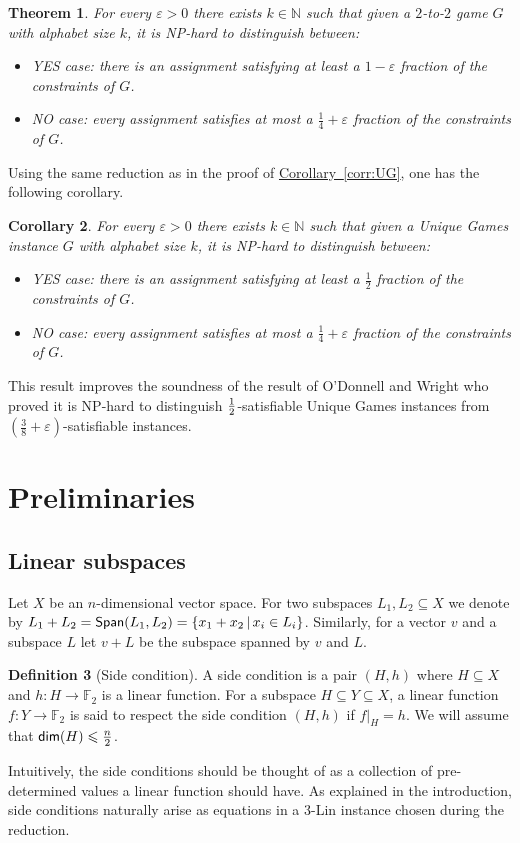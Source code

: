 \documentclass[11pt]{article}
\numberwithin{equation}{section}
\newtheorem{theorem}{Theorem}[section]
\newtheorem{corollary}[theorem]{Corollary}
\theoremstyle{definition}
\newtheorem{definition}[theorem]{Definition}
\theoremstyle{plain}
\newcommand{\expref}[2]{\hyperref[#2]{#1~\ref{#2}}}
\newcommand\half{{1\over2}}
\newcommand\Set[2]{ \left\{ #1 \,  \vert  \, #2\right\} }
\newcommand\spn{{\sf Span}}
\newcommand\eps{\varepsilon}
\renewcommand\leq{\leqslant}
\renewcommand\subset{\subseteq}
\def\F{\mathbb{F}}
\begin{document}
\begin{theorem}
For every $\eps>0$ there exists $k\in\mathbb{N}$ such that given a $2$-to-$2$ game $G$ with alphabet size $k$, it
is NP-hard to distinguish between:
\begin{itemize}
  \item YES case: there is an assignment satisfying at least
  a %
  $1-\eps$ fraction of the constraints of $G$.
  \item NO case: every assignment satisfies at most
  a %
  $\frac{1}{4}+\eps$ fraction of the constraints of $G$.
\end{itemize}
\end{theorem}


Using the same reduction as in the proof of \expref{Corollary}{corr:UG}, one has the following corollary.
\begin{corollary}
For every $\eps>0$ there exists $k\in\mathbb{N}$ such that given a Unique Games instance $G$ with alphabet size $k$, it
is NP-hard to distinguish between:
\begin{itemize}
  \item YES case: there is an assignment satisfying at least
  a %
  $\frac{1}{2}$ fraction of the constraints of $G$.
  \item NO case: every assignment satisfies at most
  a %
  $\frac{1}{4}+\eps$ fraction of the constraints of $G$.
\end{itemize}
\end{corollary}
This result improves the soundness of the result of
%
O'Donnell
and Wright \cite{OW12} who proved it is NP-hard
to distinguish $\half$-satisfiable Unique Games instances from $\left(\frac{3}{8}+\eps\right)$-satisfiable instances.
\section{Preliminaries}

\subsection{Linear subspaces}

Let $X$ be an $n$-dimensional vector space. For two subspaces $L_1,L_2\subset X$ we denote by $L_1 + L_2 = \spn(L_1,L_2) = \Set{x_1+x_2 }{ x_i\in L_i}$. Similarly, for a vector $v$ and a subspace $L$ let $v+L$ be the subspace spanned by $v$ and $L$.

%
%
%

%
\begin{definition}[Side condition]  %
A side condition is a pair $(H, h)$ where $H \subseteq X$ and $h: H \to\F_2$ is a linear
function. For a subspace $H \subseteq Y \subseteq X$,
a linear function $f: Y \to\F_2$ is said to respect the side condition $(H, h)$ if $f|_H =h$.
We will assume that $ {\sf dim}(H) \leq \frac{n}{2}$.
\end{definition}
Intuitively, the side conditions should be thought of as a collection of pre-determined values a linear function should have. As explained in
the introduction, side conditions naturally arise as equations in a $3$-Lin instance chosen during the reduction.
%
\end{document}
